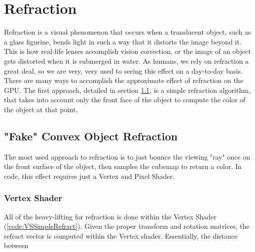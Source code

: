 \documentclass[a4paper, 12pt]{article}
\begin{document}
\pagebreak

\section{Refraction}

Refraction is a visual phenomenon that occurs when a translucent object, such
as a glass figurine, bends light in such a way that it distorts the image
beyond it. This is how real-life lenses accomplish vision correction, or the
image of an object gets distorted when it is submerged in water. As humans, we
rely on refraction a great deal, so we are very, very used to seeing this
effect on a day-to-day basis. There are many ways to accomplish the
approximate effect of refraction on the GPU. The first approach, detailed in
section \ref{section:SimpleRefract}, is a simple refraction algorithm, that
takes into account only the front face of the object to compute the color of
the object at that point.

\pagebreak

\subsection{"Fake" Convex Object Refraction}
\label{section:SimpleRefract}

The most used approach to refraction is to just bounce the viewing "ray" once
on the front surface of the object, then samples the cubemap to return a
color. In code, this effect requires just a Vertex and Pixel Shader.

\subsubsection{Vertex Shader}

All of the heavy-lifting for refraction is done within the Vertex Shader
(\ref{code:VSSimpleRefract}). Given the proper transform and rotation
matrices, the refract vector is computed within the Vertex shader.
Essentially, the distance between
\end{document}
